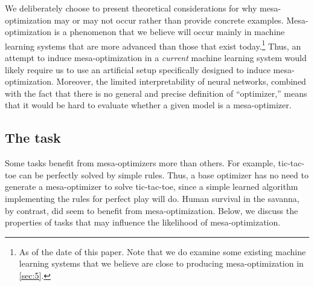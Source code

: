 \documentclass[
  onecolumn,
  natbib,
]{miri-tech-article}
\begin{document}
We deliberately choose to present theoretical considerations for why mesa-optimization may or may not occur rather than provide concrete examples. Mesa-optimization is a phenomenon that we believe will occur mainly in machine learning systems that are more advanced than those that exist today.\footnote{As of the date of this paper. Note that we do examine some existing machine learning systems that we believe are close to producing mesa-optimization in \cref{sec:5}.} Thus, an attempt to induce mesa-optimization in a \textit{current} machine learning system would likely require us to use an artificial setup specifically designed to induce mesa-optimization. Moreover, the limited interpretability of neural networks, combined with the fact that there is no general and precise definition of ``optimizer,'' means that it would be hard to evaluate whether a given model is a mesa-optimizer.

\subsection{The task}
\label{sec:2.1}

Some tasks benefit from mesa-optimizers more than others. For example, tic-tac-toe can be perfectly solved by simple rules. Thus, a base optimizer has no need to generate a mesa-optimizer to solve tic-tac-toe, since a simple learned algorithm implementing the rules for perfect play will do. Human survival in the savanna, by contrast, did seem to benefit from mesa-optimization. Below, we discuss the properties of tasks that may influence the likelihood of mesa-optimization.
\end{document}
